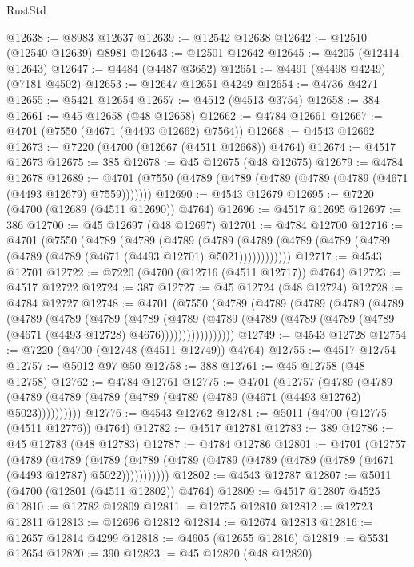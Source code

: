 \begin{lexlean}{RustStd}
\begin{coremodule}
@12638 := @8983 @12637
@12639 := @12542 @12638
@12642 := @12510 (@12540 @12639) @8981
@12643 := @12501 @12642
@12645 := @4205 (@12414 @12643)
@12647 := @4484 (@4487 @3652)
@12651 := @4491 (@4498 @4249) (@7181 @4502)
@12653 := @12647 @12651 @4249
@12654 := @4736 @4271
@12655 := @5421 @12654
@12657 := @4512 (@4513 @3754)
@12658 := 384
@12661 := @45 @12658 (@48 @12658)
@12662 := @4784 @12661
@12667 := @4701 (@7550 (@4671 (@4493 @12662) @7564))
@12668 := @4543 @12662
@12673 := @7220 (@4700 (@12667 (@4511 @12668)) @4764)
@12674 := @4517 @12673
@12675 := 385
@12678 := @45 @12675 (@48 @12675)
@12679 := @4784 @12678
@12689 := @4701 (@7550 (@4789 (@4789 (@4789 (@4789 (@4789 (@4671 (@4493 @12679) @7559)))))))
@12690 := @4543 @12679
@12695 := @7220 (@4700 (@12689 (@4511 @12690)) @4764)
@12696 := @4517 @12695
@12697 := 386
@12700 := @45 @12697 (@48 @12697)
@12701 := @4784 @12700
@12716 := @4701
    (@7550
      (@4789
        (@4789
          (@4789
            (@4789 (@4789 (@4789 (@4789 (@4789 (@4789 (@4789 (@4671 (@4493 @12701) @5021))))))))))))
@12717 := @4543 @12701
@12722 := @7220 (@4700 (@12716 (@4511 @12717)) @4764)
@12723 := @4517 @12722
@12724 := 387
@12727 := @45 @12724 (@48 @12724)
@12728 := @4784 @12727
@12748 := @4701
    (@7550
      (@4789
        (@4789
          (@4789
            (@4789
              (@4789
                (@4789
                  (@4789
                    (@4789
                      (@4789
                        (@4789
                          (@4789
                            (@4789 (@4789 (@4789 (@4789 (@4671 (@4493 @12728) @4676)))))))))))))))))
@12749 := @4543 @12728
@12754 := @7220 (@4700 (@12748 (@4511 @12749)) @4764)
@12755 := @4517 @12754
@12757 := @5012 @97 @50
@12758 := 388
@12761 := @45 @12758 (@48 @12758)
@12762 := @4784 @12761
@12775 := @4701
    (@12757
      (@4789 (@4789 (@4789 (@4789 (@4789 (@4789 (@4789 (@4789 (@4671 (@4493 @12762) @5023))))))))))
@12776 := @4543 @12762
@12781 := @5011 (@4700 (@12775 (@4511 @12776)) @4764)
@12782 := @4517 @12781
@12783 := 389
@12786 := @45 @12783 (@48 @12783)
@12787 := @4784 @12786
@12801 := @4701
    (@12757
      (@4789
        (@4789
          (@4789 (@4789 (@4789 (@4789 (@4789 (@4789 (@4789 (@4671 (@4493 @12787) @5022)))))))))))
@12802 := @4543 @12787
@12807 := @5011 (@4700 (@12801 (@4511 @12802)) @4764)
@12809 := @4517 @12807 @4525
@12810 := @12782 @12809
@12811 := @12755 @12810
@12812 := @12723 @12811
@12813 := @12696 @12812
@12814 := @12674 @12813
@12816 := @12657 @12814 @4299
@12818 := @4605 (@12655 @12816)
@12819 := @5531 @12654
@12820 := 390
@12823 := @45 @12820 (@48 @12820)

\end{coremodule}
\end{lexlean}
